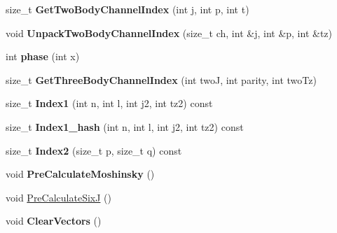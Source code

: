 \begin{DoxyCompactItemize}
\item 
\hypertarget{classModelSpace_abfbd5d5e897501136945a79d38d8c8f8}{size\-\_\-t {\bfseries Get\-Two\-Body\-Channel\-Index} (int j, int p, int t)}\label{classModelSpace_abfbd5d5e897501136945a79d38d8c8f8}

\item 
\hypertarget{classModelSpace_a7a17ef9d9c3b520a760b79995c2321f8}{void {\bfseries Unpack\-Two\-Body\-Channel\-Index} (size\-\_\-t ch, int \&j, int \&p, int \&tz)}\label{classModelSpace_a7a17ef9d9c3b520a760b79995c2321f8}

\item 
\hypertarget{classModelSpace_a6b4d1686088e3fef492df10bbd806fe2}{int {\bfseries phase} (int x)}\label{classModelSpace_a6b4d1686088e3fef492df10bbd806fe2}

\item 
\hypertarget{classModelSpace_a25038bd99af035fc1ea9f119acf130ff}{size\-\_\-t {\bfseries Get\-Three\-Body\-Channel\-Index} (int two\-J, int parity, int two\-Tz)}\label{classModelSpace_a25038bd99af035fc1ea9f119acf130ff}

\item 
\hypertarget{classModelSpace_ac7286a27dea40dce0a72226f7df82611}{size\-\_\-t {\bfseries Index1} (int n, int l, int j2, int tz2) const }\label{classModelSpace_ac7286a27dea40dce0a72226f7df82611}

\item 
\hypertarget{classModelSpace_aaf52462baf30f1b6bdb6e9fc4437c20d}{size\-\_\-t {\bfseries Index1\-\_\-hash} (int n, int l, int j2, int tz2) const }\label{classModelSpace_aaf52462baf30f1b6bdb6e9fc4437c20d}

\item 
\hypertarget{classModelSpace_a4cde58144245db89e07fdc136e5e1656}{size\-\_\-t {\bfseries Index2} (size\-\_\-t p, size\-\_\-t q) const }\label{classModelSpace_a4cde58144245db89e07fdc136e5e1656}

\item 
\hypertarget{classModelSpace_abc436144ee034558058227cac872ecb9}{void {\bfseries Pre\-Calculate\-Moshinsky} ()}\label{classModelSpace_abc436144ee034558058227cac872ecb9}

\item 
void \hyperlink{classModelSpace_abd5c59215d553bd2db47120d2db4b2ea}{Pre\-Calculate\-Six\-J} ()
\item 
\hypertarget{classModelSpace_a25aad2961ae99cdd528c4d71bb689d95}{void {\bfseries Clear\-Vectors} ()}\label{classModelSpace_a25aad2961ae99cdd528c4d71bb689d95}


\end{DoxyCompactItemize}
